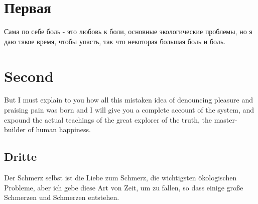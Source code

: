\documentclass{article}
\begin{document}
\chapter{Первая}
Сама по себе боль - это любовь к боли, основные экологические проблемы, но я даю такое время, чтобы упасть, так что некоторая большая боль и боль. 

\chapter{Second}
But I must explain to you how all this mistaken idea of denouncing pleasure and praising pain was born and I will give you a complete account of the system, and expound the actual teachings of the great explorer of the truth, the master-builder of human happiness.

\section{Dritte}
Der Schmerz selbst ist die Liebe zum Schmerz, die wichtigsten ökologischen Probleme, aber ich gebe diese Art von Zeit, um zu fallen, so dass einige große Schmerzen und Schmerzen entstehen.
 
\end{document}
